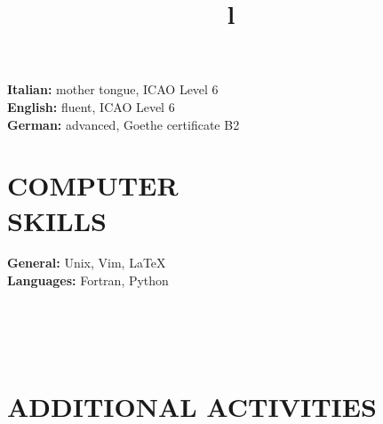 \documentclass[margin]{res}
\begin{document}
\begin{resume}
\textbf{Italian: } mother tongue, ICAO Level 6
\\
\textbf{English: } fluent, ICAO Level 6
\\
\textbf{German: } advanced, Goethe certificate B2

\section{COMPUTER\\SKILLS}

\textbf{General: } Unix, Vim, \LaTeX
\\
\textbf{Languages: } Fortran, Python

\begin{format}
\title{l}\\
\\
\body\\
\end{format}

\section{ADDITIONAL ACTIVITIES}




\end{resume}
\(\)
\end{document}
